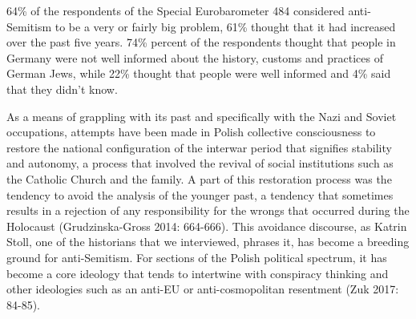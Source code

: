 64\% of the respondents of the Special Eurobarometer 484 considered anti-Semitism to be a very or fairly big problem, 61\% thought that it had increased over the past five years. 74\% percent of the respondents thought that people in Germany were not well informed about the history, customs and practices of German Jews, while 22\% thought that people were well informed and 4\% said that they didn't know. \par
As a means of grappling with its past and specifically with the Nazi and Soviet occupations, attempts have been made in Polish collective consciousness to restore the national configuration of the interwar period that signifies stability and autonomy, a process that involved the revival of social institutions such as the Catholic Church and the family. A part of this restoration process was the tendency to avoid the analysis of the younger past, a tendency that sometimes results in a rejection of any responsibility for the wrongs that occurred during the Holocaust (Grudzinska-Gross 2014: 664-666). This avoidance discourse, as Katrin Stoll, one of the historians that we interviewed, phrases it, has become a breeding ground for anti-Semitism. For sections of the Polish political spectrum, it has become a core ideology that tends to intertwine with conspiracy thinking and other ideologies such as an anti-EU or anti-cosmopolitan resentment (Zuk 2017: 84-85). \\
